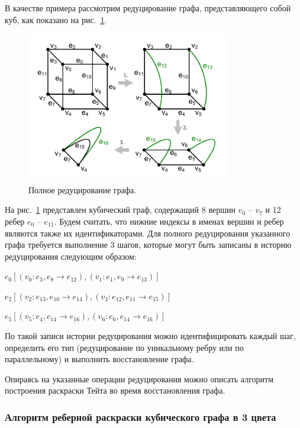 В качестве примера рассмотрим редуцирование графа, представляющего собой куб, как показано на рис.~\ref{fig:text_3_edge_coloring_3}.

\begin{figure}[ht]
\centering
\includegraphics[width=0.8\textwidth]{./pics/text_3_edge_coloring/3-reduce-0.pdf}
\singlespacing
{}\caption{Полное редуцирование графа.}
\label{fig:text_3_edge_coloring_3}
\end{figure}

На рис.~\ref{fig:text_3_edge_coloring_3} представлен кубический граф, содержащий 8 вершин $v_0$ -- $v_7$ и 12 ребер $e_0$ -- $e_{11}$.
Будем считать, что нижние индексы в именах вершин и ребер являются также их идентификаторами.
Для полного редуцирования указанного графа требуется выполнение 3 шагов, которые могут быть записаны в историю редуцирования следующим образом:

$e_0 [(v_0 : e_3, e_8 \rightarrow e_{12}), (v_1 : e_1, e_9 \rightarrow e_{13})]$

$e_2 [(v_2 : e_{13}, e_{10} \rightarrow e_{14}), (v_3 : e_{12}, e_{11} \rightarrow e_{15})]$

$e_5 [(v_5 : e_4, e_{14} \rightarrow e_{16}), (v_6 : e_6, e_{14} \rightarrow e_{16})]$

По такой записи истории редуцирования можно идентифицировать каждый шаг, определить его тип (редуцирование по уникальному ребру или по параллельному) и выполнить восстановление графа.

Опираясь на указанные операции редуцирования можно описать алгоритм построения раскраски Тейта во время восстановления графа.

\subsubsection{Алгоритм реберной раскраски кубического графа в 3 цвета}

